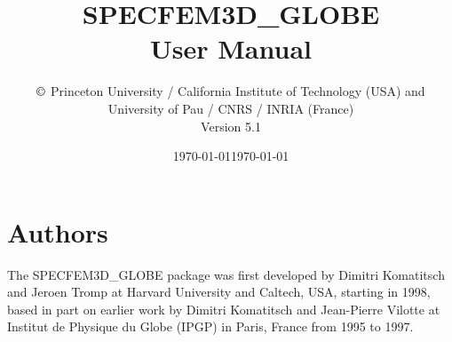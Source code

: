 \documentclass[oneside,english]{book}
\date{\today}
\begin{document}
\thispagestyle{empty}
\begin{center}
\vspace*{-1.8truecm}
\noindent{}
\end{center}
%
\title{\thispagestyle{empty}\textbf{SPECFEM3D\_GLOBE}\\
\textbf{User Manual}}
%
\author{$\copyright$ Princeton University / California Institute of Technology (USA) and\\
University of Pau / CNRS / INRIA (France)\\
Version 5.1}

\date{\noindent \today}

\maketitle

\section*{Authors}
The SPECFEM3D\_GLOBE package was first developed by Dimitri Komatitsch and Jeroen Tromp at Harvard University and Caltech, USA, starting in 1998, based in part on earlier work by Dimitri Komatitsch and Jean-Pierre Vilotte at Institut de Physique du Globe (IPGP) in Paris, France from 1995 to 1997.\\
\end{document}
